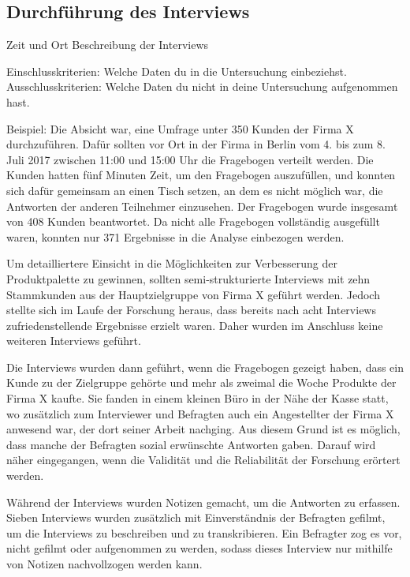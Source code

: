 \subsection{Durchführung des Interviews}

Zeit und Ort
Beschreibung der Interviews

Einschlusskriterien: Welche Daten du in die Untersuchung einbeziehst.
Ausschlusskriterien: Welche Daten du nicht in deine Untersuchung aufgenommen hast.


Beispiel: 
Die Absicht war, eine Umfrage unter 350 Kunden der Firma X durchzuführen. Dafür sollten vor Ort in der Firma in Berlin vom 4. bis zum 8. Juli 2017 zwischen 11:00 und 15:00 Uhr die Fragebogen verteilt werden. Die Kunden hatten fünf Minuten Zeit, um den Fragebogen auszufüllen, und konnten sich dafür gemeinsam an einen Tisch setzen, an dem es nicht möglich war, die Antworten der anderen Teilnehmer einzusehen. Der Fragebogen wurde insgesamt von 408 Kunden beantwortet. Da nicht alle Fragebogen vollständig ausgefüllt waren, konnten nur 371 Ergebnisse in die Analyse einbezogen werden.

Um detailliertere Einsicht in die Möglichkeiten zur Verbesserung der Produktpalette zu gewinnen, sollten semi-strukturierte Interviews mit zehn Stammkunden aus der Hauptzielgruppe von Firma X geführt werden. Jedoch stellte sich im Laufe der Forschung heraus, dass bereits nach acht Interviews zufriedenstellende Ergebnisse erzielt waren. Daher wurden im Anschluss keine weiteren Interviews geführt.

Die Interviews wurden dann geführt, wenn die Fragebogen gezeigt haben, dass ein Kunde zu der Zielgruppe gehörte und mehr als zweimal die Woche Produkte der Firma X kaufte. Sie fanden in einem kleinen Büro in der Nähe der Kasse statt, wo zusätzlich zum Interviewer und Befragten auch ein Angestellter der Firma X anwesend war, der dort seiner Arbeit nachging. Aus diesem Grund ist es möglich, dass manche der Befragten sozial erwünschte Antworten gaben. Darauf wird näher eingegangen, wenn die Validität und die Reliabilität der Forschung erörtert werden.

Während der Interviews wurden Notizen gemacht, um die Antworten zu erfassen. Sieben Interviews wurden zusätzlich mit Einverständnis der Befragten gefilmt, um die Interviews zu beschreiben und zu transkribieren. Ein Befragter zog es vor, nicht gefilmt oder aufgenommen zu werden, sodass dieses Interview nur mithilfe von Notizen nachvollzogen werden kann.
